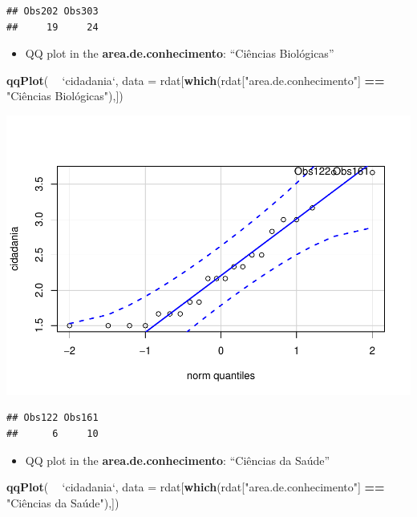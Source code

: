 \documentclass[]{article}
\newenvironment{Shaded}{\begin{snugshade}}{\end{snugshade}}
\newcommand{\DataTypeTok}[1]{\textcolor[rgb]{0.13,0.29,0.53}{#1}}
\newcommand{\KeywordTok}[1]{\textcolor[rgb]{0.13,0.29,0.53}{\textbf{#1}}}
\newcommand{\NormalTok}[1]{#1}
\newcommand{\OperatorTok}[1]{\textcolor[rgb]{0.81,0.36,0.00}{\textbf{#1}}}
\newcommand{\StringTok}[1]{\textcolor[rgb]{0.31,0.60,0.02}{#1}}
\providecommand{\tightlist}{%
  \setlength{\itemsep}{0pt}\setlength{\parskip}{0pt}}
\begin{document}
\begin{verbatim}
## Obs202 Obs303 
##     19     24
\end{verbatim}

\begin{itemize}
\tightlist
\item
  QQ plot in the \textbf{area.de.conhecimento}: ``Ciências Biológicas''
\end{itemize}

\begin{Shaded}
\begin{Highlighting}[]
\KeywordTok{qqPlot}\NormalTok{( }\OperatorTok{~}\StringTok{ `}\DataTypeTok{cidadania}\StringTok{`}\NormalTok{, }\DataTypeTok{data =}\NormalTok{ rdat[}\KeywordTok{which}\NormalTok{(rdat[}\StringTok{"area.de.conhecimento"}\NormalTok{] }\OperatorTok{==}\StringTok{ "Ciências Biológicas"),])}
\end{Highlighting}
\end{Shaded}

\includegraphics{factorialAnova_files/figure-latex/unnamed-chunk-10-1.pdf}

\begin{verbatim}
## Obs122 Obs161 
##      6     10
\end{verbatim}

\begin{itemize}
\tightlist
\item
  QQ plot in the \textbf{area.de.conhecimento}: ``Ciências da Saúde''
\end{itemize}

\begin{Shaded}
\begin{Highlighting}[]
\KeywordTok{qqPlot}\NormalTok{( }\OperatorTok{~}\StringTok{ `}\DataTypeTok{cidadania}\StringTok{`}\NormalTok{, }\DataTypeTok{data =}\NormalTok{ rdat[}\KeywordTok{which}\NormalTok{(rdat[}\StringTok{"area.de.conhecimento"}\NormalTok{] }\OperatorTok{==}\StringTok{ "Ciências da Saúde"),])}
\end{Highlighting}
\end{Shaded}
\end{document}
